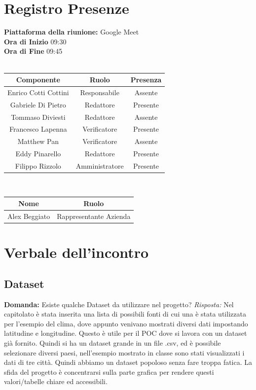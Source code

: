 \documentclass{article}
\begin{document}
\section{Registro Presenze}
\textbf{Piattaforma della riunione:} Google Meet \\
\textbf{Ora di Inizio} 09:30\\
\textbf{Ora di Fine} 09:45\\
\\
\begin{tabular}{|c|c|c|}
    \hline
    \textbf{Componente} & \textbf{Ruolo} & \textbf{Presenza}\\
    \hline
    Enrico Cotti Cottini & Responsabile & Assente \\ 
    \hline
    Gabriele Di Pietro & Redattore & Presente \\ 
    \hline
    Tommaso Diviesti & Redattore & Assente \\ 
    \hline 
    Francesco Lapenna & Verificatore & Presente \\ 
    \hline
    Matthew Pan & Verificatore & Assente \\ 
    \hline 
    Eddy Pinarello & Redattore & Presente \\ 
    \hline 
    Filippo Rizzolo & Amministratore & Presente \\ 
    \hline 
\end{tabular}
\\
\newline
\newline
\begin{tabular}{|c|c|}
    \hline
    \textbf{Nome} & \textbf{Ruolo}\\
    \hline
    Alex Beggiato & Rappresentante Azienda \\
    \hline
\end{tabular}
\newpage

\section{Verbale dell'incontro}
\subsection{Dataset}
\textbf{Domanda:} Esiste qualche Dataset da utilizzare nel progetto?
\newline
\textit{Risposta:} Nel capitolato è stata inserita una lista di possibili fonti di cui una è stata utilizzata per l’esempio del clima, dove appunto venivano mostrati diversi dati impostando latitudine e longitudine. Questo è utile per il POC dove si lavora con un dataset già fornito. 
Quindi si ha un dataset grande in un file .csv, ed è possibile selezionare diversi paesi, nell’esempio mostrato in classe sono stati visualizzati i dati di tre città. Quindi abbiamo un dataset popoloso senza fare troppa fatica.
La sfida del progetto è concentrarsi sulla parte grafica per rendere questi valori/tabelle chiare ed accessibili.
\end{document}
